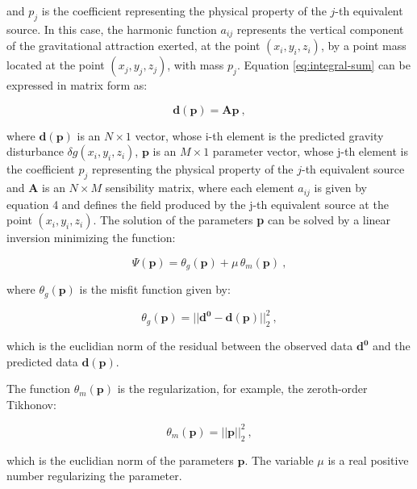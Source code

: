 \documentclass[paper]{geophysics}
\begin{document}
and $p_j$ is the coefficient representing the physical property of the $j$-th equivalent source. In this case, the harmonic function $a_{ij}$ represents the vertical component of the gravitational attraction exerted, at the point $(x_{i}, y_{i}, z_{i})$, by a point mass located at the point $(x_{j}, y_{j}, z_{j})$, with mass $p_{j}$.
Equation \ref{eq:integral-sum} can be expressed in matrix form as:

\begin{equation}
\mathbf{d}(\mathbf{p}) = \mathbf{A} \mathbf{p} \: ,
\label{eq:predicted-data-vector}
\end{equation}

where $\mathbf{d}(\mathbf{p})$ is an $N \times 1$ vector, whose i-th element is the predicted gravity disturbance $\delta g(x_{i}, y_{i}, z_{i})$, $\mathbf{p}$ is an $M \times 1$ parameter vector,  whose j-th element is the coefficient $p_{j}$ representing the physical property of the $j$-th equivalent source and $\mathbf{A}$ is  an $N \times M$ sensibility matrix, where each element $a_{ij}$ is given by equation 4 and defines the field produced by  the j-th equivalent source at the point $(x_{i}, y_{i}, z_{i})$.
The solution of the parameters \textbf{p} can be solved by a linear inversion minimizing the function:

\begin{equation}
\Psi(\mathbf{p}) = \theta_g(\mathbf{p}) + \mu \, \theta_m(\mathbf{p}) \: ,
\label{eq:goal-function}
\end{equation}

where $\theta_g(\mathbf{p})$ is the misfit function given by:

\begin{equation}
\theta_g(\mathbf{p}) = ||\mathbf{d^0}-\mathbf{d(p)}||_2^2 \: ,
\label{eq:goal-function_d}
\end{equation}

which is the euclidian norm of the residual between the observed data $\mathbf{d^0}$ and the predicted data $\mathbf{d(p)}$.

The function $\theta_m(\mathbf{p})$ is the regularization, for example, the zeroth-order Tikhonov:

\begin{equation}
\theta_m(\mathbf{p}) = ||\mathbf{p}||_2^2 \: ,
\label{eq:tikhonov-function}
\end{equation}

which is the euclidian norm of the parameters $\mathbf{p}$. The variable $\mu$ is a real positive number regularizing the parameter.
\end{document}
